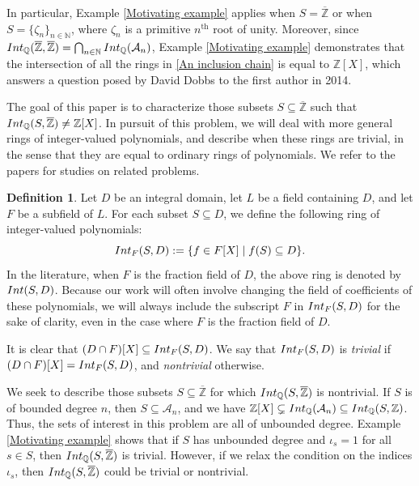 \documentclass{article}
\theoremstyle{definition}\newtheorem{Def}[equation]{Definition}
\theoremstyle{definition}\newtheorem{Ques}[equation]{Question}
\theoremstyle{definition}\newtheorem{Conj}[equation]{Conjecture}
\theoremstyle{definition}\newtheorem{Not}[equation]{Notation}
\newcommand{\N}{\mathbb{N}}
\newcommand{\Q}{\mathbb{Q}}
\newcommand{\oZ}{\overline{\Z}}
\newcommand{\Z}{\mathbb{Z}}
\newcommand{\Int}{\textnormal{Int}}
\newcommand{\IntQ}{\Int_{\Q}}
\newcommand{\An}{\mathcal{A}_n}
\numberwithin{equation}{section}
\begin{document}
In particular, Example \ref{Motivating example} applies when $S = \oZ$ or when $S = \{\zeta_n\}_{n \in \N}$, where $\zeta_n$ is a primitive $n^\text{th}$ root of unity. Moreover, since $\IntQ(\oZ,\oZ) = \bigcap_{n \in \N} \IntQ(\An)$, Example \ref{Motivating example} demonstrates that the intersection of all the rings in \eqref{An inclusion chain} is equal to $\Z[X]$, which answers a question posed by David Dobbs to the first author in 2014. %

The goal of this paper is to characterize those subsets $S \subseteq \oZ$ such that $\IntQ(S,\oZ) \ne \Z[X]$. In pursuit of this problem, we will deal with more general rings of integer-valued polynomials, and describe when these rings are trivial, in the sense that they are equal to ordinary rings of polynomials. We refer to the papers \cite{PerWerNontrivial,Rush} for studies on related problems.

\begin{Def}\label{IVP notation}
Let $D$ be an integral domain, let $L$ be a field containing $D$, and let $F$ be a subfield of $L$. For each subset $S \subseteq D$, we define the following ring of integer-valued polynomials:
\begin{equation*}
\Int_F(S,D) := \{f \in F[X] \mid f(S) \subseteq D\}.
\end{equation*}
In the literature, when $F$ is the fraction field of $D$, the above ring is denoted by $\Int(S,D)$. Because our work will often involve changing the field of coefficients of these polynomials, we will always include the subscript $F$ in $\Int_F(S,D)$ for the sake of clarity, even in the case where $F$ is the fraction field of $D$.

It is clear that $(D \cap F)[X] \subseteq \Int_F(S,D)$. We say that $\Int_F(S,D)$ is \textit{trivial} if $(D \cap F)[X] = \Int_F(S,D)$, and \textit{nontrivial} otherwise.
\end{Def}

We seek to describe those subsets $S \subseteq \oZ$ for which $\IntQ(S,\oZ)$ is nontrivial. If $S$ is of bounded degree $n$, then $S \subseteq \An$, and we have $\Z[X] \subsetneq \IntQ(\An) \subseteq \IntQ(S,\Z)$. Thus, the sets of interest in this problem are all of unbounded degree. Example \ref{Motivating example} shows that if $S$ has unbounded degree and $\iota_s = 1$ for all $s \in S$, then $\IntQ(S,\oZ)$ is trivial. However, if we relax the condition on the indices $\iota_s$, then $\IntQ(S,\oZ)$ could be trivial or nontrivial.
\end{document}
